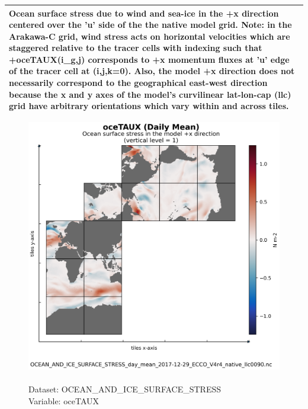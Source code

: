 \begin{longtable}{|p{}|p{}|p{}|p{}|}
\multicolumn{4}{|p{1\textwidth}|}{Ocean surface stress due to wind and sea-ice in the +x direction centered over the 'u' side of the the native model grid. Note: in the Arakawa-C grid, wind stress acts on horizontal velocities which are staggered relative to the tracer cells with indexing such that +oceTAUX(i\_g,j) corresponds to +x momentum fluxes at 'u' edge of the tracer cell at (i,j,k=0). Also, the model +x direction does not necessarily correspond to the geographical east-west direction because the x and y axes of the model's curvilinear lat-lon-cap (llc) grid have arbitrary orientations which vary within and across tiles.} \\ \hline
\end{longtable}

\begin{figure}[H]
\centering
\includegraphics[scale=0.5]{../images/plots/native_plots/Ocean_and_Sea-Ice_Surface_Stress/oceTAUX.png}
\caption{\\Dataset: OCEAN\_AND\_ICE\_SURFACE\_STRESS\\Variable: oceTAUX}
\label{tab:table-OCEAN_AND_ICE_SURFACE_STRESS_oceTAUX-Plot}
\end{figure}
\pagebreak
